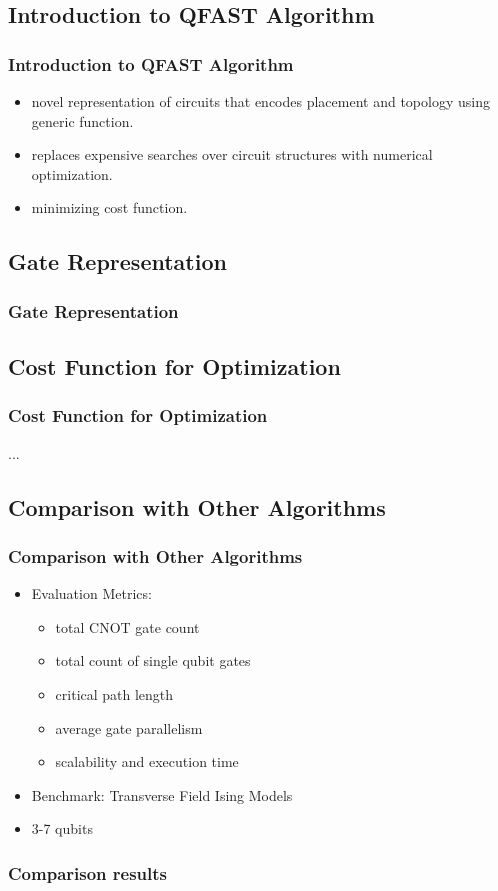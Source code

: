\documentclass[aspectratio=1610]{beamer}
\begin{document}
\subsection{Introduction to QFAST Algorithm}
\begin{frame}
\frametitle{Introduction to QFAST Algorithm}
\begin{itemize}
  \item novel representation of circuits that encodes placement and topology using generic function.
  \item replaces expensive searches over circuit structures with numerical optimization.
  \item minimizing cost function.
\end{itemize}
\end{frame}

\subsection{Gate Representation}
\begin{frame}
\frametitle{Gate Representation}

\end{frame}

\subsection{Cost Function for Optimization}
\begin{frame}
\frametitle{Cost Function for Optimization}
...
\end{frame}

\subsection{Comparison with Other Algorithms}
\begin{frame}
\frametitle{Comparison with Other Algorithms}
\begin{itemize}
  \item Evaluation Metrics:
  \begin{itemize}
    \item total CNOT gate count
    \item total count of single qubit gates
    \item critical path length
    \item average gate parallelism
    \item scalability and execution time
  \end{itemize}
  \item Benchmark: Transverse Field Ising Models
  \item 3-7 qubits
\end{itemize}
\end{frame}
\begin{frame}
\frametitle{Comparison results}
\end{frame}
\end{document}
